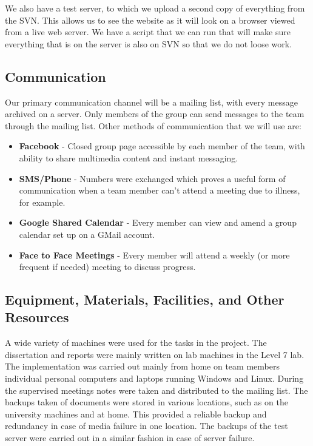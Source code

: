 \documentclass{l3proj}
\begin{document}
We also have a test server, to which we upload a second copy of everything from
the SVN. This allows us to see the website as it will look on a browser viewed
from a live web server. We have a script that we can run that will make sure
everything that is on the server is also on SVN so that we do not loose work.

\subsection{Communication} Our primary communication channel will be a mailing
list, with every message archived on a server. Only members of the group can
send messages to the team through the mailing list. Other methods of
communication that we will use are: \begin{itemize} \item \textbf{Facebook} -
Closed group page accessible by each member of the team, with ability to share
multimedia content and instant messaging.  \item \textbf{SMS/Phone} - Numbers
were exchanged which proves a useful form of communication when a team member
can't attend a meeting due to illness, for example.  \item \textbf{Google Shared
Calendar} - Every member can view and amend a group calendar set up on a GMail
account.  \item \textbf{Face to Face Meetings} - Every member will attend a
weekly (or more frequent if needed) meeting to discuss progress.  \end{itemize}

\subsection{Equipment, Materials, Facilities, and Other Resources} A wide
variety of machines were used for the tasks in the project. The dissertation and
reports were mainly written on lab machines in the Level 7 lab.  The
implementation was carried out mainly from home on team members individual
personal computers and laptops running Windows and Linux. \newline During the supervised meetings notes
were taken and distributed to the mailing list.  The backups taken of documents
were stored in various locations, such as on the university machines and at
home. This provided a reliable backup and redundancy in case of media failure in
one location. The backups of the test server were carried out in a similar
fashion in case of server failure.
\end{document}
